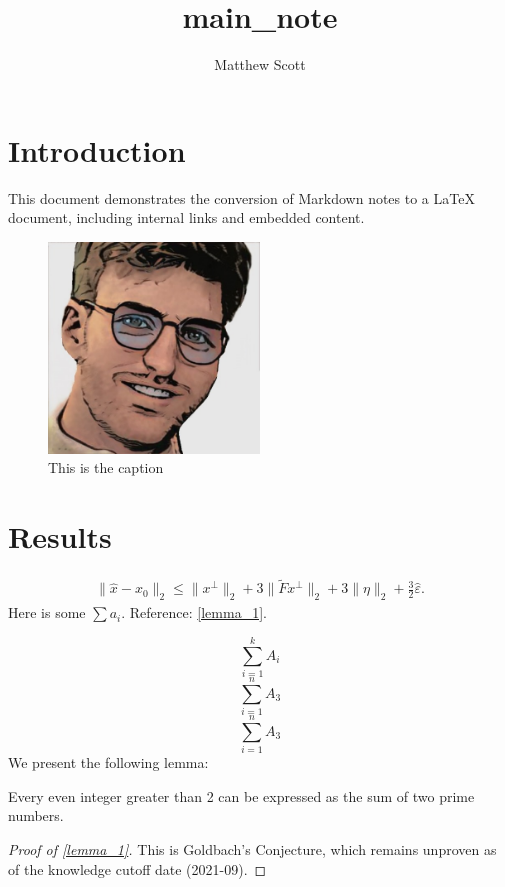 \documentclass{article}
\title{main\_note}
\author{Matthew Scott}
\begin{document}
\maketitle
{}
\section{Introduction}
\label{introduction}
This document demonstrates the conversion of Markdown notes to a LaTeX document, including internal links and embedded content.

\begin{figure}[h]
\centering
\includegraphics[width=0.5\textwidth]{Files/download.jpeg}
\caption{This is the caption}
\end{figure}
\section{Results}
\label{results}


\begin{align*}
  \|\hat x - x_0\|_2
  \leq \|x^\perp\|_2 + 3\|\tilde{F}x^\perp\|_2 + 3 \|\eta\|_2 + \frac{3}{2}\hat\varepsilon.
\end{align*}
Here is some $\sum a_i$. Reference: \autoref{lemma_1}.

$$\sum_{i=1}^k A_i$$
$$\sum_{i=1}^n A_3$$
$$\sum_{i=1}^n A_3$$
We present the following lemma:

\begin{lemma}
\label{lemma_1}
Every even integer greater than 2 can be expressed as the sum of two prime numbers.

\end{lemma}

\begin{proof}[Proof of \autoref{lemma_1}]
\label{proof:lemma_1}
This is Goldbach's Conjecture, which remains unproven as of the knowledge cutoff date (2021-09).

\end{proof}
\end{document}
